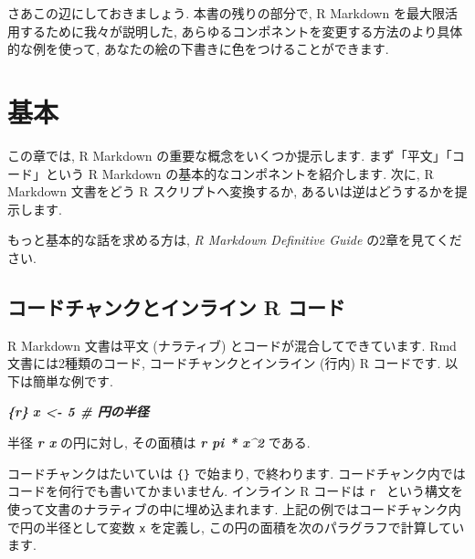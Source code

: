 \documentclass[
  11pt,
]{bxjsreport}
\newenvironment{Shaded}{\begin{snugshade}}{\end{snugshade}}
\newcommand{\InformationTok}[1]{\textcolor[rgb]{0.56,0.35,0.01}{\textbf{\textit{#1}}}}
\newcommand{\NormalTok}[1]{#1}
\begin{document}
さあこの辺にしておきましょう. 本書の残りの部分で, R Markdown を最大限活用するために我々が説明した, あらゆるコンポネントを変更する方法のより具体的な例を使って, あなたの絵の下書きに色をつけることができます.

\hypertarget{basics}{%
\chapter{基本}\label{basics}}

この章では, R Markdown の重要な概念をいくつか提示します. まず「平文」「コード」という R Markdown の基本的なコンポネントを紹介します. 次に, R Markdown 文書をどう R スクリプトへ変換するか, あるいは逆はどうするかを提示します.

もっと基本的な話を求める方は, \emph{R Markdown Definitive Guide} \autocite{rmarkdown2018} の2章を見てください.

\hypertarget{r-code}{%
\section{コードチャンクとインライン R コード}\label{r-code}}

R Markdown 文書は平文 (ナラティブ) とコードが混合してできています. Rmd 文書には2種類のコード, コードチャンクとインライン (行内) R コードです. 以下は簡単な例です.

\begin{Shaded}
\begin{Highlighting}[]
\InformationTok{\textasciigrave{}\textasciigrave{}\textasciigrave{}\{r\}}
\InformationTok{x \textless{}{-} 5  \# 円の半径}
\InformationTok{\textasciigrave{}\textasciigrave{}\textasciigrave{}}

\NormalTok{半径 }\InformationTok{\textasciigrave{}r x\textasciigrave{}}\NormalTok{ の円に対し,}
\NormalTok{その面積は }\InformationTok{\textasciigrave{}r pi * x\^{}2\textasciigrave{}}\NormalTok{ である.}
\end{Highlighting}
\end{Shaded}

コードチャンクはたいていは \texttt{\textasciigrave{}\textasciigrave{}\textasciigrave{}\{\}} で始まり, \texttt{\textasciigrave{}\textasciigrave{}\textasciigrave{}} で終わります. コードチャンク内ではコードを何行でも書いてかまいません. インライン R コードは \texttt{\textasciigrave{}r\ \textasciigrave{}} という構文を使って文書のナラティブの中に埋め込まれます. 上記の例ではコードチャンク内で円の半径として変数 \texttt{x} を定義し, この円の面積を次のパラグラフで計算しています.
\end{document}
